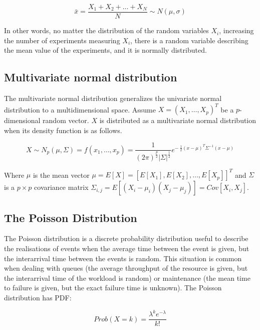 \begin{equation}
\bar{x}=\frac{X_1+X_2+\ldots+X_N}{N} \sim N(\mu,\sigma)
\label{eq_centralLimitTheorem}
\end{equation}



In other words, no matter the distribution of the random variables $X_i$, increasing the number of experiments measuring $X_i$, there is a random variable describing the mean value of the experiments, and it is normally distributed.

\subsection{Multivariate normal distribution}
The multivariate normal distribution generalizes the univariate normal distribution to a multidimensional space. Assume $X=\left(X_1,\ldots,X_p\right)^T$ be a $p$-dimensional random vector. $X$ is distributed as a multivariate normal distribution when its density function is as follows.

\begin{equation}
X\sim N_p\left(\mu,\Sigma\right)= f\left(x_1,\ldots,x_p\right)=\frac{1}{\left(2\pi\right)^\frac{p}{2}\left|\Sigma\right|^\frac{1}{2}}e^{-\ \frac{1}{2}\left(x-\mu\right)^T\Sigma^{-1}(x-\mu)}
\label{eq_multivariateNormal}
\end{equation}

Where $\mu$ is the mean vector $\mu=E\left[X\right]=\left[E\left[X_1\right],E\left[X_2\right],\ldots,E\left[X_p\right]\right]^T$ and $\Sigma$ is a $p\times p$ covariance matrix $\Sigma_{i,j}=E\left[\left(X_i-\mu_i\right)\left(X_j-\mu_j\right)\right]=Cov[X_i,X_j]$.

\subsection{The Poisson Distribution}
The Poisson distribution is a discrete probability distribution useful to describe the realisations of events when the average time between the event is given, but the interarrival time between the events is random. This situation is common when dealing with queues (the average throughput of the resource is given, but the interarrival time of the workload is random) or maintenance (the mean time to failure is given, but the exact failure time is unknown). The Poisson distribution has PDF:

\begin{equation}
Prob\left(X=k\right)=\frac{\lambda^ke^{-\lambda}}{k!}
\label{eq_poissonPDF}
\end{equation}

